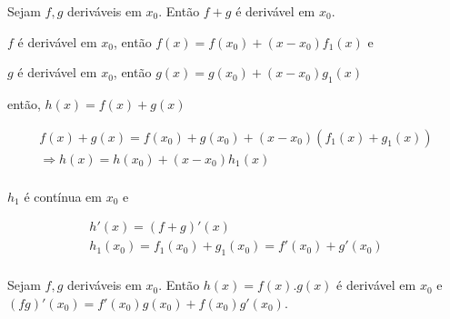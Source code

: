 \documentclass[11pt, oneside, a4paper]{gsm-l}
\begin{document}
\begin{teo}

Sejam $f,g$ deriváveis em $x_0 $. Então $f + g$ é derivável
em $x_0 $.

\end{teo}

\begin{dem}

$f$ é derivável em $x_0 $, então $f\left( x \right) = f\left( {x_0
} \right) + \left( {x - x_0 } \right)f_1 \left( x \right)$ e

$g$ é derivável em $x_0 $, então $g\left( x \right) = g\left( {x_0
} \right) + \left( {x - x_0 } \right)g_1 \left( x \right)$

então, $h\left( x \right) = f\left( x \right) + g\left( x \right)$

\[
\begin{array}{l}
f\left( x \right) + g\left( x \right) = f\left( {x_0 } \right) + g\left(
{x_0 } \right) + \left( {x - x_0 } \right)\left( {f_1 \left( x \right) + g_1
\left( x \right)} \right) \\
\Rightarrow h\left( x \right) = h\left( {x_0 } \right) + \left( {x - x_0 }
\right)h_1 \left( x \right) \\
\end{array}
\]

$h_1 $ é contínua em $x_0 $ e

\[
\begin{array}{l}
h'\left( x \right) = \left( {f + g} \right)'\left( x \right) \\
h_1 \left( {x_0 } \right) = f_1 \left( {x_0 } \right) + g_1 \left( {x_0 }
\right) = f'\left( {x_0 } \right) + g'\left( {x_0 } \right) \\
\end{array}
\]

\end{dem}

\begin{teo}

Sejam $f,g$ deriváveis em $x_0 $. Então $h\left( x \right) = f\left(
x \right).g\left( x \right)$ é derivável em $x_0 $ e $\left( {fg}
\right)'\left( {x_0 } \right) = f'\left( {x_0 } \right)g\left( {x_0 }
\right) + f\left( {x_0 } \right)g'\left( {x_0 } \right)$.

\end{teo}
\end{document}
